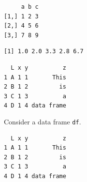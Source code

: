 \begin{Shaded}
\begin{Highlighting}[]
\NormalTok{w[[}\NormalTok{]] }
\end{Highlighting}
\end{Shaded}

\begin{verbatim}
     a b c
[1,] 1 2 3
[2,] 4 5 6
[3,] 7 8 9
\end{verbatim}

\begin{Shaded}
\begin{Highlighting}[]
\OperatorTok{$}
\end{Highlighting}
\end{Shaded}

\begin{verbatim}
[1] 1.0 2.0 3.3 2.8 6.7
\end{verbatim}

\begin{Shaded}
\begin{Highlighting}[]
\OperatorTok{$}
\end{Highlighting}
\end{Shaded}

\begin{verbatim}
  L x y          z
1 A 1 1       This
2 B 1 2         is
3 C 1 3          a
4 D 1 4 data frame
\end{verbatim}

Consider a data frame \texttt{df}.

\begin{Shaded}
\begin{Highlighting}[]
\end{Highlighting}
\end{Shaded}

\begin{verbatim}
  L x y          z
1 A 1 1       This
2 B 1 2         is
3 C 1 3          a
4 D 1 4 data frame
\end{verbatim}

\begin{Shaded}
\begin{Highlighting}[]
\NormalTok{df[,}\NormalTok{] }
\end{Highlighting}
\end{Shaded}

